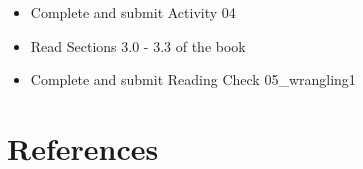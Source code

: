 \documentclass[
  letterpaper,
  DIV=11,
  numbers=noendperiod]{scrreprt}
\newlength{\cslhangindent}
\newlength{\cslentryspacingunit} %
\newenvironment{CSLReferences}[2] %
 {%
  \setlength{\parindent}{0pt}
  \ifodd #1
  \let\oldpar\par
  \def\par{\hangindent=\cslhangindent\oldpar}
  \fi
  \setlength{\parskip}{#2\cslentryspacingunit}
 }%
 {}
\begin{document}
\begin{itemize}
\item
  Complete and submit Activity 04
\item
  Read Sections 3.0 - 3.3 of the book
\item
  Complete and submit Reading Check 05\_wrangling1
\end{itemize}


\hypertarget{references}{%
\chapter*{References}\label{references}}

\hypertarget{refs}{}
\begin{CSLReferences}{0}{0}
\end{CSLReferences}
\end{document}
